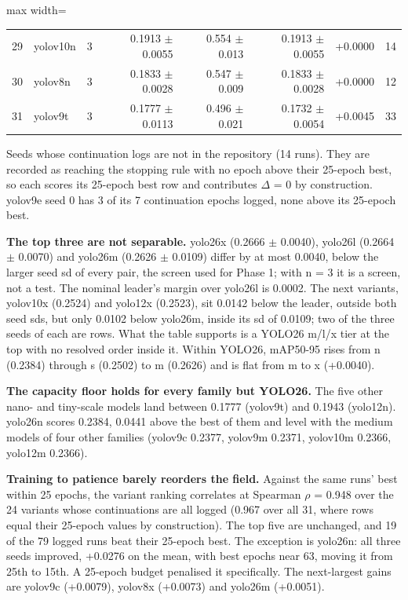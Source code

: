 \documentclass[10pt]{article}
\begin{document}
\begin{table}[htbp]
\begin{adjustbox}{max width=\linewidth}
\begin{tabular}{rllrrrrr}
29 & yolov10n & 3 & 0.1913 $\pm$ 0.0055 & 0.554 $\pm$ 0.013 & 0.1913 $\pm$ 0.0055 & +0.0000 & 14 \\
30 & yolov8n & 3 & 0.1833 $\pm$ 0.0028 & 0.547 $\pm$ 0.009 & 0.1833 $\pm$ 0.0028 & +0.0000 & 12 \\
31 & yolov9t & 3 & 0.1777 $\pm$ 0.0113 & 0.496 $\pm$ 0.021 & 0.1732 $\pm$ 0.0054 & +0.0045 & 33 \\
\bottomrule
\end{tabular}
\end{adjustbox}
\par\smallskip\raggedright\footnotesize \textdagger{} Seeds whose continuation logs are not in the repository (14 runs). They are recorded as reaching the stopping rule with no epoch above their 25-epoch best, so each scores its 25-epoch best row and contributes $\Delta$ = 0 by construction. yolov9e seed 0 has 3 of its 7 continuation epochs logged, none above its 25-epoch best.
\end{table}
\textbf{The top three are not separable.} yolo26x (0.2666 $\pm$ 0.0040), yolo26l (0.2664 $\pm$ 0.0070) and yolo26m (0.2626 $\pm$ 0.0109) differ by at most 0.0040, below the larger seed sd of every pair, the screen used for Phase 1; with n = 3 it is a screen, not a test. The nominal leader's margin over yolo26l is 0.0002. The next variants, yolov10x (0.2524) and yolo12x (0.2523), sit 0.0142 below the leader, outside both seed sds, but only 0.0102 below yolo26m, inside its sd of 0.0109; two of the three seeds of each are \textdagger{} rows. What the table supports is a YOLO26 m/l/x tier at the top with no resolved order inside it. Within YOLO26, mAP50-95 rises from n (0.2384) through s (0.2502) to m (0.2626) and is flat from m to x (+0.0040).

\textbf{The capacity floor holds for every family but YOLO26.} The five other nano- and tiny-scale models land between 0.1777 (yolov9t) and 0.1943 (yolo12n). yolo26n scores 0.2384, 0.0441 above the best of them and level with the medium models of four other families (yolov9c 0.2377, yolov9m 0.2371, yolov10m 0.2366, yolo12m 0.2366).

\textbf{Training to patience barely reorders the field.} Against the same runs' best within 25 epochs, the variant ranking correlates at Spearman $\rho$ = 0.948 over the 24 variants whose continuations are all logged (0.967 over all 31, where \textdagger{} rows equal their 25-epoch values by construction). The top five are unchanged, and 19 of the 79 logged runs beat their 25-epoch best. The exception is yolo26n: all three seeds improved, +0.0276 on the mean, with best epochs near 63, moving it from 25th to 15th. A 25-epoch budget penalised it specifically. The next-largest gains are yolov9c (+0.0079), yolov8x (+0.0073) and yolo26m (+0.0051).
\end{document}
